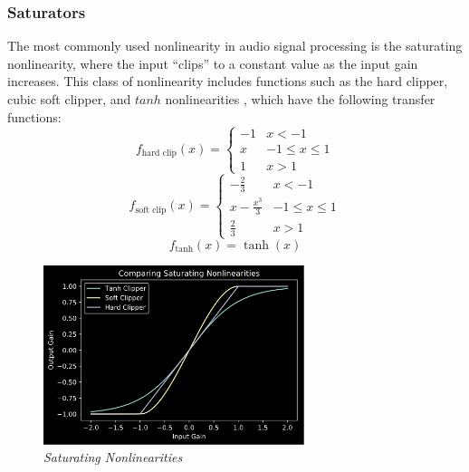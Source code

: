 \documentclass[twoside,a4paper]{article}
\begin{document}
\subsubsection{Saturators} \label{sec:sat}
%
The most commonly used nonlinearity in audio signal processing is
the saturating nonlinearity, where the input ``clips'' to a constant
value as the input gain increases. This class of nonlinearity includes
functions such as the hard clipper, cubic soft clipper, and $tanh$
nonlinearities \cite{Yeh}, which have the following transfer functions:
%
\begin{equation}
    f_{\text{hard clip}}(x) = \begin{cases}
        -1& x < -1 \\
        x& -1 \leq x \leq 1 \\
        1& x > 1
    \end{cases}
    \label{eq:hard-clip}
\end{equation}
\newline
%
\begin{equation}
    f_{\text{soft clip}}(x) = \begin{cases}
        -\frac{2}{3}& x < -1 \\
        x - \frac{x^3}{3}& -1 \leq x \leq 1 \\
        \frac{2}{3}& x > 1
    \end{cases}
    \label{eq:soft-clip}
\end{equation}
\newline
%
\begin{equation}
    f_{\text{tanh}}(x) = \tanh(x)
    \label{eq:tanh-clip}
\end{equation}
%
\begin{figure}[h]
    \center
    \includegraphics[width=3in]{../NonlinearBiquad/Pics/Sat-NLs.png}
    \caption{\label{Sats}{\it Saturating Nonlinearities}}
\end{figure}
%
\end{document}
